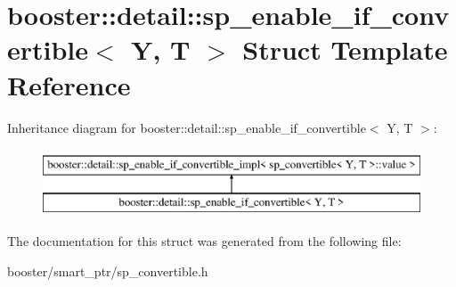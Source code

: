 \section{booster\+:\+:detail\+:\+:sp\+\_\+enable\+\_\+if\+\_\+convertible$<$ Y, T $>$ Struct Template Reference}
\label{structbooster_1_1detail_1_1sp__enable__if__convertible}
Inheritance diagram for booster\+:\+:detail\+:\+:sp\+\_\+enable\+\_\+if\+\_\+convertible$<$ Y, T $>$\+:\begin{figure}[H]
\begin{center}
\leavevmode
\includegraphics[height=2.000000cm]{structbooster_1_1detail_1_1sp__enable__if__convertible}
\end{center}
\end{figure}


The documentation for this struct was generated from the following file\+:\begin{DoxyCompactItemize}
\item 
booster/smart\+\_\+ptr/sp\+\_\+convertible.\+h\end{DoxyCompactItemize}
